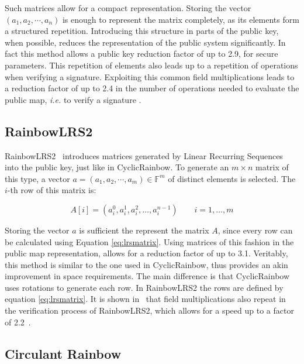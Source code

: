 \documentclass{ufsctex/ufsctex}
\begin{document}
Such matrices allow for a compact representation. Storing the vector $(a_1,
a_2, \cdots, a_n)$ is enough to represent the matrix completely, as its
elements form a structured repetition. Introducing this structure in parts of
the public key, when possible, reduces the representation of the public system
significantly. In fact this method allows a public key reduction factor of up
to 2.9, for secure parameters. This repetition of elements also leads up to a
repetition of operations when verifying a signature. Exploiting this common
field multiplications leads to a reduction factor of up to 2.4 in the number of
operations needed to evaluate the public map, \textit{i.e.} to verify a
signature \cite[Table 10.3]{petzoldt2013thesis}.

\subsection{RainbowLRS2}

RainbowLRS2~\cite[Section 9.2]{petzoldt2013thesis} introduces matrices
generated by Linear Recurring Sequences into the public key, just like in
CyclicRainbow. To generate an $m \times n$ matrix of this type, a vector $a =
(a_1, a_2, \cdots, a_m) \in \mathbb{F}^m$ of distinct elements is selected.
The $i$-th row of this matrix is:

\begin{equation}\label{eq:lrsmatrix}
A[i] = (a_i^0, a_i^1, a_i^2, \dots, a_i^{n-1}) \qquad i = 1, \dots, m
\end{equation}

Storing the vector $a$ is sufficient the represent the matrix $A$, since every
row can be calculated using Equation \ref{eq:lrsmatrix}. Using matrices of this
fashion in the public map representation, allows for a reduction factor of up
to 3.1. Veritably, this method is similar to the one used in CyclicRainbow,
thus provides an akin improvement in space requirements. The main difference is
that CyclicRainbow uses rotations to generate each row. In RainbowLRS2 the rows
are defined by equation \ref{eq:lrsmatrix}. It is shown
in~\cite{petzoldt2013thesis} that field multiplications also repeat in the
verification process of RainbowLRS2, which allows for a speed up to a factor of
2.2~\cite[Table 10.3]{petzoldt2013thesis}.

\subsection{Circulant Rainbow}
\end{document}

